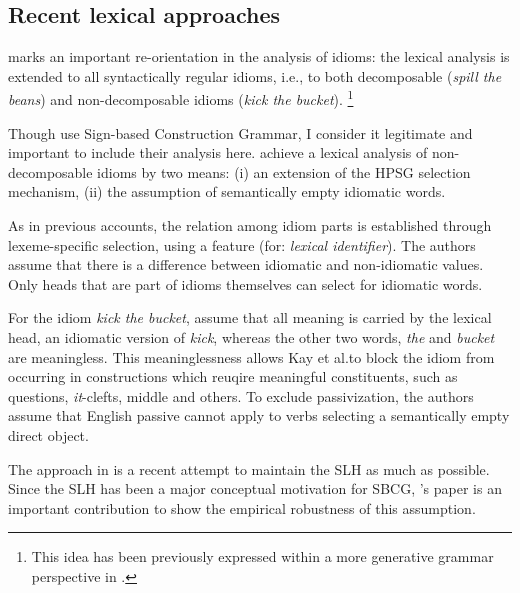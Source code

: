 \documentclass[output=paper]{langsci/langscibook}
\begin{document}
\subsection{Recent lexical approaches}
\label{Sec-RecentLexical}

\cite{KSF2015a} marks an important re-orientation in the analysis of idioms: the lexical analysis is extended to all syntactically regular idioms, i.e., to both decomposable (\emph{spill the beans}) and non-decomposable idioms (\emph{kick the bucket}).%
\footnote{This idea has been previously expressed within a more generative grammar perspective in \cite{Everaert:10}. 
}

Though \cite{KSF2015a} use Sign-based Construction Grammar, I consider it legitimate and important to include their analysis here.
%
\cite{KSF2015a} achieve a lexical analysis of non-decomposable idioms by two means: (i) an extension of the HPSG selection mechanism, (ii) the assumption of semantically empty idiomatic words. 

As in previous accounts, the relation among idiom parts is established through lexeme-specific selection, using a feature  (for: \emph{lexical identifier}). 
The authors assume that there is a difference between idiomatic and non-idiomatic  values. 
Only heads that are part of idioms themselves can select for idiomatic words. 

For the idiom \emph{kick the bucket}, \cite{KSF2015a} assume that all meaning is carried by the lexical head, an idiomatic version of \emph{kick}, whereas the other two words, \emph{the} and \emph{bucket} are meaningless. 
This meaninglessness allows Kay et al.\@ to block the idiom from occurring in constructions which reuqire meaningful constituents, such as questions, \emph{it}-clefts, middle and others. 
To exclude passivization, the authors assume that English passive cannot apply to verbs selecting a semantically empty direct object.

The approach in \cite{KSF2015a} is a recent attempt to maintain the SLH as much as possible. 
Since the SLH has been a major conceptual motivation for SBCG, \citeauthor{KSF2015a}'s paper is an important contribution to show the empirical robustness of this assumption.
\end{document}
